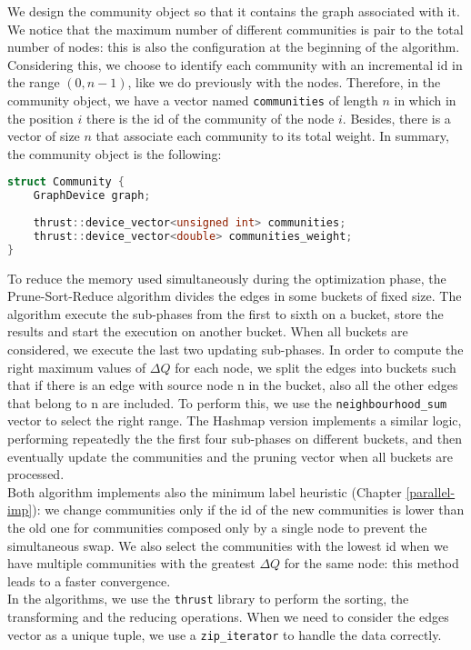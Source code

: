 We design the community object so that it contains the graph associated with it. We notice that the maximum number of different communities is pair to the total number of nodes: this is also the configuration at the beginning of the algorithm. Considering this, we choose to identify each community with an incremental id in the range $(0, n-1)$, like we do previously with the nodes. Therefore, in the community object, we have a vector named \verb|communities| of length $n$ in which in the position $i$ there is the id of the community of the node $i$. Besides, there is a vector of size $n$ that associate each community to its total weight.  In summary,  the community object is the following:
\begin{lstlisting}[language=C++]
struct Community {
	GraphDevice graph;
	
	thrust::device_vector<unsigned int> communities;
	thrust::device_vector<double> communities_weight;
}
\end{lstlisting}
To reduce the memory used simultaneously during the optimization phase, the Prune-Sort-Reduce algorithm divides the edges in some buckets of fixed size. 
The algorithm execute the sub-phases from the first to sixth on a bucket, store the results and start the execution on another bucket. When all buckets are considered, we execute the last two updating sub-phases.
In order to compute the right maximum values of $\Delta Q$ for each node, we split the edges into buckets such that if there is an edge with source node n in the bucket, also all the other edges that belong to n are included. To perform this, we use the \verb|neighbourhood_sum| vector to select the right range. The Hashmap version implements a similar logic, performing repeatedly the the first four sub-phases on different buckets,  and then eventually update the communities and the pruning vector when all buckets are processed.\\ 
Both algorithm implements also the minimum label heuristic (Chapter \ref{parallel-imp}): we change communities only if the id of the new communities is lower than the old one for communities composed only by a single node to prevent the simultaneous swap. We also select the communities with the lowest id when we have multiple communities with the greatest $\Delta Q$ for the same node: this method leads to a faster convergence.\\ 
In the algorithms, we use the \verb|thrust| library to perform the sorting, the transforming and the reducing operations. When we need to consider the edges vector as a unique tuple, we use a \verb|zip_iterator| to handle the data correctly.\\ 
